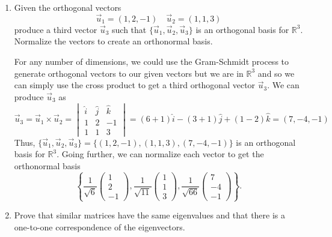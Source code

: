 \documentclass[a4paper,12pt]{article}
\newcommand{\reals}{\mathbb{R}}
\newcommand{\pmat}[1]{\begin{pmatrix} #1 \end{pmatrix}}
\begin{document}
\begin{enumerate}[label = \arabic*.]
	\item Given the orthogonal vectors
	\[
		\vec{u}_1 = (1,2,-1) \quad \vec{u}_2 = (1, 1, 3)
	\]
	produce a third vector $ \vec{u}_3 $ such that $ \{\vec{u}_1, \vec{u}_2, \vec{u}_3\} $ is an orthogonal basis for $ \reals^3 $. Normalize the vectors to create an orthonormal basis.
	
	For any number of dimensions, we could use the Gram-Schmidt process to generate orthogonal vectors to our given vectors but we are in $ \reals^3 $ and so we can simply use the cross product to get a third orthogonal vector $ \vec{u}_3 $. We can produce $ \vec{u}_3 $ as
	\[
		\vec{u}_3 = \vec{u}_1 \times \vec{u}_2
		=
		\begin{vmatrix}
			\hat{i} & \hat{j} & \hat{k} \\
			1 & 2 & -1 \\
			1 & 1 & 3
		\end{vmatrix}
		=
		(6 + 1)\hat{i} - (3 + 1)\hat{j} + (1 - 2)\hat{k} = (7, -4, -1)
	\]
	Thus, $ \{\vec{u}_1, \vec{u}_2, \vec{u}_3\} = \{(1,2,-1), (1,1,3), (7,-4,-1)\} $ is an orthogonal basis for $ \reals^3 $. Going further, we can normalize each vector to get the orthonormal basis
	\[
		\left\{
		\frac{1}{\sqrt{6}} \pmat{1 \\ 2 \\ -1},
		\frac{1}{\sqrt{11}} \pmat{1 \\ 1 \\ 3},
		\frac{1}{\sqrt{66}} \pmat{7 \\ -4 \\ -1} 
		\right\}.
	\]
	
	\item Prove that similar matrices have the same eigenvalues and that there is a one-to-one correspondence of the eigenvectors.
	

\end{enumerate}
\end{document}
